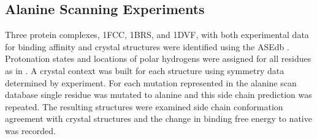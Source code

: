 \subsection{Alanine Scanning Experiments}
Three protein complexes, 1FCC, 1BRS, and 1DVF, with both experimental data for binding affinity and crystal structures were identified using the ASEdb \cite{thorn2001asedb}.
Protonation states and locations of polar hydrogens were assigned for all residues as in \cite{li2007assignment}.
A crystal context was built for each structure using symmetry data determined by experiment.
For each mutation represented in the alanine scan database single residue was mutated to alanine and this side chain prediction was repeated.
The resulting structures were examined side chain conformation agreement with crystal structures and the change in binding free energy to native was recorded. 
